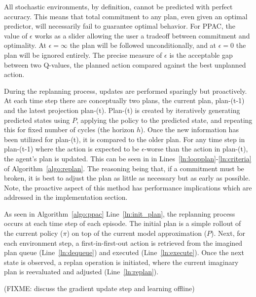 \documentclass{article}
\newcommand{\infinity}{ \infty }
\begin{document}
        All stochastic environments, by definition, cannot be predicted with perfect accuracy. This means that total commitment to any plan, even given an optimal predictor, will necessarily fail to guarantee optimal behavior. For PPAC, the value of \(\epsilon\) works as a slider allowing the user a tradeoff between commitment and optimality. At \(\epsilon = \infinity\) the plan will be followed unconditionally, and at \(\epsilon = 0\) the plan will be ignored entirely. The precise measure of $\epsilon$ is the acceptable gap between two Q-values, the planned action compared against the best unplanned action.
        
        During the replanning process, updates are performed sparingly but proactively. At each time step there are conceptually two plans, the current plan, plan-(t-1) and the latest projection plan-(t). Plan-(t) is created by iteratively generating predicted states using \(P\), applying the policy to the predicted state, and repeating this for fixed number of cycles (the horizon \(h\)). Once the new information has been utilized for plan-(t), it is compared to the older plan. For any time step in plan-(t-1) where the action is expected to be \(\epsilon\)-worse than the action in plan-(t), the agent's plan is updated. This can be seen in in Lines~\ref{ln:loopplan}-\ref{ln:criteria} of Algorithm~\ref{algo:replan}. The reasoning being that, if a commitment must be broken, it is best to adjust the plan as little as necessary but as early as possible. Note, the proactive aspect of this method has performance implications which are addressed in the implementation section.
        
        As seen in Algorithm~\ref{algo:ppac} Line~\ref{ln:init_plan}, the replanning process occurs at each time step of each episode. The initial plan is a simple rollout of the current policy ($\pi$) on top of the current model approximation ($P$). Next, for each environment step, a first-in-first-out action is retrieved from the imagined plan queue (Line~\ref{ln:dequeue}) and executed (Line~\ref{ln:execute}). Once the next state is observed, a replan operation is initiated, where the current imaginary plan is reevaluated and adjusted (Line~\ref{ln:replan}).
        
        (FIXME: discuss the gradient update step and learning offline)
        
\end{document}
